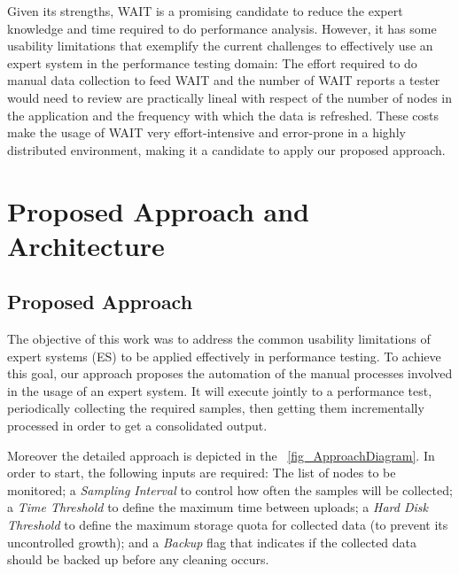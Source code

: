 \documentclass[runningheads,a4paper]{llncs}
\begin{document}
Given its strengths, WAIT is a promising candidate to reduce the expert
knowledge and time required to do performance analysis. However, it has
some usability limitations that exemplify the current challenges to effectively
use an expert system in the performance testing domain: The effort required to
do manual data collection to feed WAIT and the number of WAIT reports a tester
would need to review are practically lineal with respect of the number of nodes
in the application and the frequency with which the data is refreshed. These costs 
make the usage of WAIT very effort-intensive and error-prone in a highly
distributed environment, making it a candidate to apply our proposed approach.

\vspace{-5pt}
\section{Proposed Approach and Architecture}
\label{ProposedApproach}
\vspace{-5pt}


\subsection{Proposed Approach}

The objective of this work was to address the common usability limitations of
expert systems (ES) to be applied effectively in performance testing. To achieve
this goal, our approach proposes the automation of the manual processes involved
in the usage of an expert system. It will execute jointly to a performance test,
periodically collecting the required samples, then getting them incrementally
processed in order to get a consolidated output.

Moreover the detailed approach is depicted in the \figurename
~\ref{fig_ApproachDiagram}. In order to start, the following inputs are
required: The list of nodes to be monitored; a \emph{Sampling Interval} to
control how often the samples will be collected; a \emph{Time Threshold} to
define the maximum time between uploads; a \emph{Hard Disk Threshold} to define
the maximum storage quota for collected data (to prevent its uncontrolled
growth); and a \emph{Backup} flag that indicates if the collected data should be
backed up before any cleaning occurs.
\end{document}
